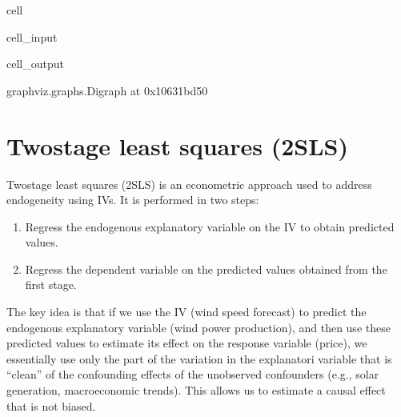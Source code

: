 \documentclass[letterpaper,10pt,english]{jupyterBook}
\begin{document}
\begin{sphinxuseclass}{cell}
\begin{sphinxVerbatimInput}
\begin{sphinxuseclass}{cell_input}
\begin{sphinxVerbatim}[commandchars=\\\{\}]
\end{sphinxVerbatim}

\end{sphinxuseclass}\end{sphinxVerbatimInput}
\begin{sphinxVerbatimOutput}

\begin{sphinxuseclass}{cell_output}
\begin{sphinxVerbatim}[commandchars=\\\{\}]
\PYGZlt{}graphviz.graphs.Digraph at 0x10631bd50\PYGZgt{}
\end{sphinxVerbatim}

\end{sphinxuseclass}\end{sphinxVerbatimOutput}

\end{sphinxuseclass}

\section{Two\sphinxhyphen{}stage least squares (2SLS)}
\label{\detokenize{notebooks/instrumental_variables:two-stage-least-squares-2sls}}
\sphinxAtStartPar
Two\sphinxhyphen{}stage least squares (2SLS) is an econometric approach used to address endogeneity using IVs. It is performed in two steps:
\begin{enumerate}
%
\item {} 
\sphinxAtStartPar
Regress the endogenous explanatory variable on the IV to obtain predicted values.

\item {} 
\sphinxAtStartPar
Regress the dependent variable on the predicted values obtained from the first stage.

\end{enumerate}

\sphinxAtStartPar
The key idea is that if we use the IV (wind speed forecast) to predict the endogenous explanatory variable (wind power production), and then use these predicted values to estimate its effect on the response variable (price), we essentially use only the part of the variation in the explanatori variable that is “clean” of the confounding effects of the unobserved confounders (e.g., solar generation, macroeconomic trends). This allows us to estimate a causal effect that is not biased.
\end{document}
